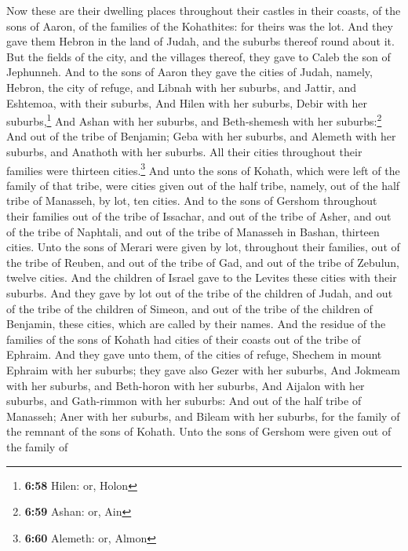  Now these are their dwelling places throughout their
castles in their coasts, of the sons of Aaron, of the families of the
Kohathites: for theirs was the lot.  And they gave them
Hebron in the land of Judah, and the suburbs thereof round about it.
 But the fields of the city, and the villages thereof,
they gave to Caleb the son of Jephunneh.  And to the sons
of Aaron they gave the cities of Judah, namely, Hebron, the city of
refuge, and Libnah with her suburbs, and Jattir, and Eshtemoa, with
their suburbs,  And Hilen with her suburbs, Debir with
her suburbs,\footnote{\textbf{6:58} Hilen: or, Holon} 
And Ashan with her suburbs, and Beth-shemesh with her
suburbs:\footnote{\textbf{6:59} Ashan: or, Ain}  And out
of the tribe of Benjamin; Geba with her suburbs, and Alemeth with her
suburbs, and Anathoth with her suburbs. All their cities throughout
their families were thirteen cities.\footnote{\textbf{6:60} Alemeth: or,
  Almon}  And unto the sons of Kohath, which were left of
the family of that tribe, were cities given out of the half tribe,
namely, out of the half tribe of Manasseh, by lot, ten cities.
 And to the sons of Gershom throughout their families out
of the tribe of Issachar, and out of the tribe of Asher, and out of the
tribe of Naphtali, and out of the tribe of Manasseh in Bashan, thirteen
cities.  Unto the sons of Merari were given by lot,
throughout their families, out of the tribe of Reuben, and out of the
tribe of Gad, and out of the tribe of Zebulun, twelve cities.
 And the children of Israel gave to the Levites these
cities with their suburbs.  And they gave by lot out of
the tribe of the children of Judah, and out of the tribe of the children
of Simeon, and out of the tribe of the children of Benjamin, these
cities, which are called by their names.  And the residue
of the families of the sons of Kohath had cities of their coasts out of
the tribe of Ephraim.  And they gave unto them, of the
cities of refuge, Shechem in mount Ephraim with her suburbs; they gave
also Gezer with her suburbs,  And Jokmeam with her
suburbs, and Beth-horon with her suburbs,  And Aijalon
with her suburbs, and Gath-rimmon with her suburbs:  And
out of the half tribe of Manasseh; Aner with her suburbs, and Bileam
with her suburbs, for the family of the remnant of the sons of Kohath.
 Unto the sons of Gershom were given out of the family of
